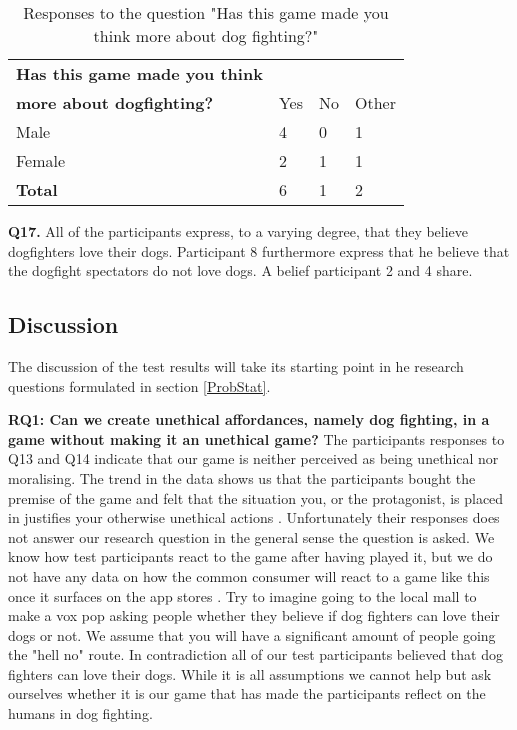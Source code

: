 \begin{table}[h]
\centering
\begin{tabular}{l l l l}
\hline
\textbf{Has this game made you think}\\
\textbf{more about dogfighting?} & Yes & No & Other \\
\hline
Male & 4 & 0 & 1 \\
Female & 2 & 1 & 1 \\
\textbf{Total} & 6 & 1 & 2 \\
\hline
\end{tabular}
\caption{\label{tab:thin}Responses to the question "Has this game made you think more about dog fighting?"}
\end{table}


\textbf{Q17.} All of the participants express, to a varying degree, that they believe dogfighters love their dogs. Participant 8 furthermore express that he believe that the dogfight spectators do not love dogs. A belief participant 2 and 4 share.


\subsection{Discussion}
The discussion of the test results will take its starting point in he research questions formulated in section \ref{ProbStat}. 


\textbf{RQ1: Can we create unethical affordances, namely dog fighting, in a game without making it an unethical game?}
The participants responses to Q13 and Q14 indicate that our game is neither perceived as being unethical nor moralising. The trend in the data shows us that the participants bought the premise of the game and felt that the situation you, or the protagonist, is placed in justifies your otherwise unethical actions . Unfortunately their responses does not answer our research question in the general sense the question is asked. We know how test participants react to the game after having played it, but we do not have any data on how the common consumer will react to a game like this once it surfaces on the app stores . Try to imagine going to the local mall to make a vox pop asking people whether they believe if dog fighters can love their dogs or not. We assume that you will have a significant amount of people going the "hell no" route. In contradiction all of our test participants believed that dog fighters can love their dogs. While it is all assumptions we cannot help but ask ourselves whether it is our game that has made the participants reflect on the humans in dog fighting.


